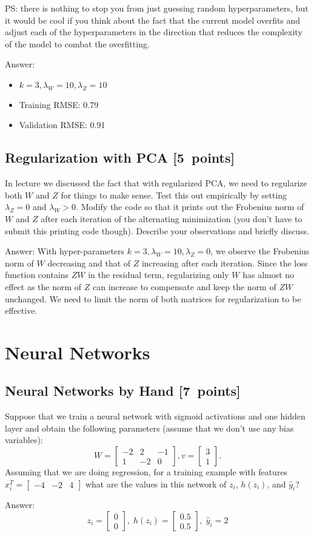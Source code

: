 \documentclass{article}
\newcommand{\blu}[1]{{\textcolor{blu}{#1}}}
\newenvironment{answer}{\par\begingroup\color{gre}Answer: }{\endgroup}
\let\ask\blu
\newcommand\pts[1]{\textcolor{pointscolour}{[#1~points]}}
\newcommand{\mat}[1]{\begin{bmatrix}#1\end{bmatrix}}
\begin{document}
PS: there is nothing to stop you from just guessing random hyperparameters, but it would be cool if you think about the fact that the current model overfits and adjust each of the hyperparameters in the direction that reduces the complexity of the model to combat the overfitting.

\begin{answer}
    \begin{itemize}
        \item $k = 3,\lambda_W = 10,\lambda_Z = 10$
        \item Training RMSE: 0.79
        \item Validation RMSE: 0.91
    \end{itemize}
\end{answer}


\subsection{Regularization with PCA \pts{5}}

In lecture we discussed the fact that with regularized PCA, we need to regularize both $W$ and $Z$ for things to make sense. Test this out empirically by setting $\lambda_Z=0$ and $\lambda_W>0$. Modify the code so that it prints out the Frobenius norm of $W$ and $Z$ after each iteration of the alternating minimization (you don't have to submit this printing code though). \ask{Describe your observations and briefly discuss.}
\begin{answer}
    With hyper-parameters $k = 3,\lambda_W = 10,\lambda_Z = 0$, we observe the Frobenius norm of $W$ decreasing and that of $Z$ increasing after each iteration. Since the loss function contains $ZW$ in the residual term, regularizing only $W$ has almost no effect as the norm of $Z$ can increase to compensate and keep the norm of $ZW$ unchanged. We need to limit the norm of both matrices for regularization to be effective.
\end{answer}


\section{Neural Networks}

\subsection{Neural Networks by Hand \pts{7}}

Suppose that we train a neural network with sigmoid activations and one hidden layer and obtain the following parameters (assume that we don't use any bias variables):
\[
W = \mat{-2 & 2 & -1\\1 & -2 & 0}, v = \mat{3 \\1}.
\]
Assuming that we are doing regression, \ask{for a training example with features $x_i^T = \mat{-4 &-2 & 4}$ what are the values in this network of $z_i$, $h(z_i)$, and $\hat{y}_i$?}
\begin{answer}
    \[
        z_i = \mat{0\\0},\; h(z_i)= \mat{0.5\\0.5},\; \hat{y}_i= 2
    \]
\end{answer}
\end{document}
